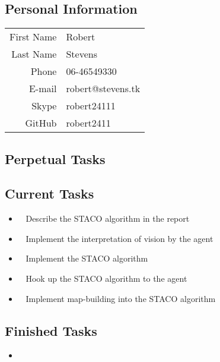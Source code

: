 \subsection{Personal Information}
\begin{table}[h!]
	\begin{tabular}{rl}
	First Name 	& Robert\\
	Last Name	& Stevens\\
	Phone		& 06-46549330\\
	E-mail		& robert@stevens.tk\\
	Skype		& robert24111\\
	GitHub		& robert2411
\end{tabular}
\end{table}

\subsection{Perpetual Tasks}

\subsection{Current Tasks}
\begin{itemize}
	\item~
	Describe the STACO algorithm in the report
	\item~
	Implement the interpretation of vision by the agent
	\item~
	Implement the STACO algorithm
	\item~
	Hook up the STACO algorithm to the agent
	\item~
	Implement map-building into the STACO algorithm
\end{itemize}

\subsection{Finished Tasks}
\begin{itemize}
	\item
\end{itemize}
